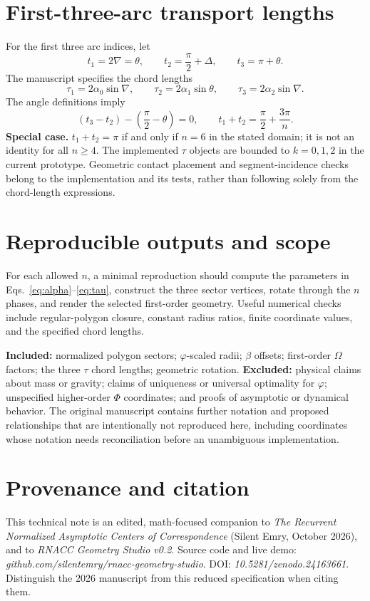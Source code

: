 \documentclass[10pt,letterpaper]{article}
\begin{document}
\section{First-three-arc transport lengths}
For the first three arc indices, let
\begin{equation}
 t_1=2\nabla=\theta,\qquad t_2=\frac\pi2+\Delta,\qquad t_3=\pi+\theta.
\end{equation}
The manuscript specifies the chord lengths
\begin{equation}
\tau_1=2\alpha_0\sin\nabla,\qquad
\tau_2=2\alpha_1\sin\theta,\qquad
\tau_3=2\alpha_2\sin\nabla.
\label{eq:tau}
\end{equation}
The angle definitions imply
\begin{equation}
(t_3-t_2)-\left(\frac\pi2-\theta\right)=0,
\qquad t_1+t_2=\frac\pi2+\frac{3\pi}{n}.
\end{equation}
\textbf{Special case.} $t_1+t_2=\pi$ if and only if $n=6$ in the stated domain; it is not an identity for all $n\geq4$. The implemented $\tau$ objects are bounded to $k=0,1,2$ in the current prototype. Geometric contact placement and segment-incidence checks belong to the implementation and its tests, rather than following solely from the chord-length expressions.

\section{Reproducible outputs and scope}
For each allowed $n$, a minimal reproduction should compute the parameters in Eqs.~\eqref{eq:alpha}--\eqref{eq:tau}, construct the three sector vertices, rotate through the $n$ phases, and render the selected first-order geometry. Useful numerical checks include regular-polygon closure, constant radius ratios, finite coordinate values, and the specified chord lengths.

\textbf{Included:} normalized polygon sectors; $\varphi$-scaled radii; $\beta$ offsets; first-order $\Omega$ factors; the three $\tau$ chord lengths; geometric rotation. \textbf{Excluded:} physical claims about mass or gravity; claims of uniqueness or universal optimality for $\varphi$; unspecified higher-order $\Phi$ coordinates; and proofs of asymptotic or dynamical behavior. The original manuscript contains further notation and proposed relationships that are intentionally not reproduced here, including coordinates whose notation needs reconciliation before an unambiguous implementation.

\section*{Provenance and citation}
This technical note is an edited, math-focused companion to \emph{The Recurrent Normalized Asymptotic Centers of Correspondence} (Silent Emry, October 2026), and to \emph{RNACC Geometry Studio v0.2}. Source code and live demo: \emph{github.com/silentemry/rnacc-geometry-studio}. DOI: \emph{10.5281/zenodo.24163661}. Distinguish the 2026 manuscript from this reduced specification when citing them.
\end{document}
